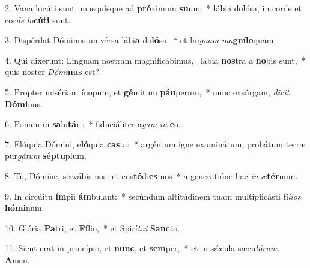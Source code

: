 2. Vana locúti sunt unusquísque ad \textbf{pró}ximum \textbf{su}um:~*  lábia dolósa, in corde et cor\textit{de} \textit{lo}\textbf{cú}\textbf{ti} sunt.\

3. Dispérdat Dóminus univérsa lábi\textbf{a} do\textbf{ló}sa,~*  et lin\textit{guam} \textit{ma}\textbf{gní}\textbf{lo}quam.\

4. Qui dixérunt: Linguam nostram magnificábimus, \dag\  lábia \textbf{nos}tra a \textbf{no}bis sunt,~*  quis noster \textit{Dó}\textit{mi}\textbf{nus} est?\

5. Propter misériam ínopum, et \textbf{gé}mitum \textbf{páu}perum,~*  nunc exsúrgam, \textit{di}\textit{cit} \textbf{Dó}\textbf{mi}nus.\

6. Ponam in \textbf{sa}lu\textbf{tá}ri:~*  fiduciáliter a\textit{gam} \textit{in} \textbf{e}o.\

7. Elóquia Dómini, e\textbf{ló}quia \textbf{cas}ta:~*  argéntum igne examinátum, probátum terræ pur\textit{gá}\textit{tum} \textbf{sép}\textbf{tu}plum.\

8. Tu, Dómine, servábis nos: et cus\textbf{tó}di\textbf{es} nos~*  a generatióne hac \textit{in} \textit{æ}\textbf{tér}num.\

9. In circúitu \textbf{ím}pii \textbf{ám}bulant:~*  secúndum altitúdinem tuam multiplicásti fí\textit{li}\textit{os} \textbf{hó}\textbf{mi}num.\

10. Glória \textbf{Pa}tri, et \textbf{Fí}lio,~*  et Spirí\textit{tu}\textit{i} \textbf{Sanc}to.\

11. Sicut erat in princípio, et \textbf{nunc}, et \textbf{sem}per,~*  et in sǽcula sæcu\textit{ló}\textit{rum}. \textbf{A}men.\

